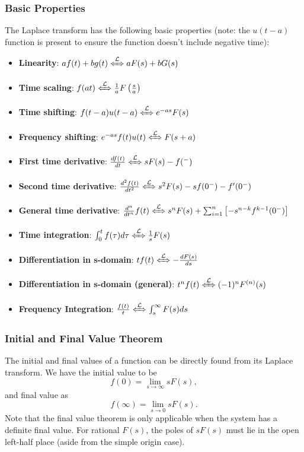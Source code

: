\documentclass{article}
\begin{document}
\subsubsection{Basic Properties}
The Laplace transform has the following basic properties (note: the $u(t-a)$ function is present to ensure the function doesn't include negative time):
\begin{itemize}
    \item \textbf{Linearity}: $af(t)+bg(t)\xLeftrightarrow{\mathcal{L}}aF(s)+bG(s)$
    \item \textbf{Time scaling}: $f(at)\xLeftrightarrow{\mathcal{L}}\frac{1}{a}F \left( \frac{s}{a} \right)$
    \item \textbf{Time shifting}: $f(t-a)u(t-a)\xLeftrightarrow{\mathcal{L}}e^{-as}F(s)$
    \item \textbf{Frequency shifting}: $e^{-as}f(t)u(t)\xLeftrightarrow{\mathcal{L}}F(s+a)$
    \item \textbf{First time derivative}: $\frac{d f(t)}{d t}\xLeftrightarrow{\mathcal{L}}sF(s)-f(^-)$
    \item \textbf{Second time derivative}: $\frac{d^2f(t)}{d t^2}\xLeftrightarrow{\mathcal{L}}s^2F(s)-sf(0^-)-f'(0^-)$
    \item \textbf{General time derivative}: $\frac{d ^n}{d t^n}f(t)\xLeftrightarrow{\mathcal{L}}s^nF(s)+\sum_{i=1}^{n} \left[ -s^{n-k}f^{k-1}(0^-) \right]$
    \item \textbf{Time integration}: $\int_0^tf(\tau )d\tau \xLeftrightarrow{\mathcal{L}}\frac{1}{s}F(s)$
    \item \textbf{Differentiation in s-domain}: $tf(t)\xLeftrightarrow{\mathcal{L}}-\frac{d F(s)}{d s}$
    \item \textbf{Differentiation in s-domain (general)}: $t^nf(t)\xLeftrightarrow{\mathcal{L}}(-1)^nF^{(n)}(s)$
    \item \textbf{Frequency Integration}: $\frac{f(t)}{t}\xLeftrightarrow{\mathcal{L}}\int_s^\infty F(s)ds$
\end{itemize}

\subsubsection{Initial and Final Value Theorem}
The initial and final values of a function can be directly found from its Laplace transform. We have the initial value to be
\[
    f(0)=\lim_{s\to\infty} sF(s),
\]
and final value as
\[
    f(\infty)=\lim_{s\to0} sF(s).
\]
Note that the final value theorem is only applicable when the system has a definite final value. For rational $F(s)$, the poles of $sF(s)$ must lie in the open left-half place (aside from the simple origin case).
\end{document}
